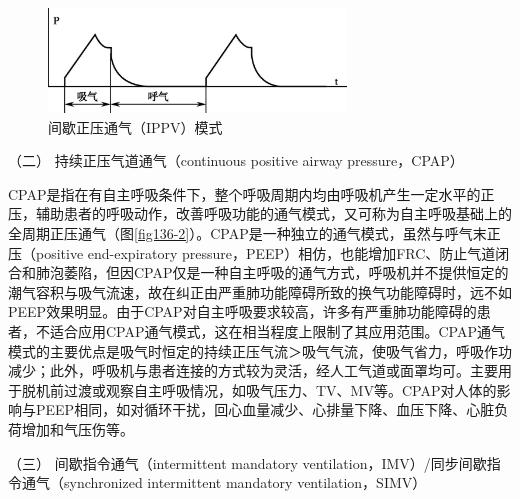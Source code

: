 \begin{figure}[!htbp]
 \centering
 \includegraphics[width=3.11458in,height=1.09375in]{./images/Image00507.jpg}
 \captionsetup{justification=centering}
 \caption{间歇正压通气（IPPV）模式}
 \label{fig136-1}
  \end{figure} 

\hypertarget{text00368.htmlux5cux23CHP16-3-2-1-2}{}
（二） 持续正压气道通气（continuous positive airway pressure，CPAP）

CPAP是指在有自主呼吸条件下，整个呼吸周期内均由呼吸机产生一定水平的正压，辅助患者的呼吸动作，改善呼吸功能的通气模式，又可称为自主呼吸基础上的全周期正压通气（图\ref{fig136-2}）。CPAP是一种独立的通气模式，虽然与呼气末正压（positive
end-expiratory
pressure，PEEP）相仿，也能增加FRC、防止气道闭合和肺泡萎陷，但因CPAP仅是一种自主呼吸的通气方式，呼吸机并不提供恒定的潮气容积与吸气流速，故在纠正由严重肺功能障碍所致的换气功能障碍时，远不如PEEP效果明显。由于CPAP对自主呼吸要求较高，许多有严重肺功能障碍的患者，不适合应用CPAP通气模式，这在相当程度上限制了其应用范围。CPAP通气模式的主要优点是吸气时恒定的持续正压气流＞吸气气流，使吸气省力，呼吸作功减少；此外，呼吸机与患者连接的方式较为灵活，经人工气道或面罩均可。主要用于脱机前过渡或观察自主呼吸情况，如吸气压力、TV、MV等。CPAP对人体的影响与PEEP相同，如对循环干扰，回心血量减少、心排量下降、血压下降、心脏负荷增加和气压伤等。

\hypertarget{text00368.htmlux5cux23CHP16-3-2-1-3}{}
（三） 间歇指令通气（intermittent mandatory
ventilation，IMV）/同步间歇指令通气（synchronized intermittent mandatory
ventilation，SIMV）


